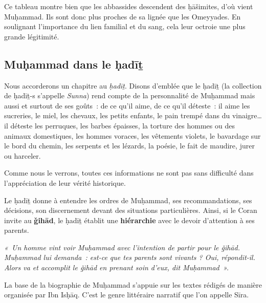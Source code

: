 Ce tableau montre bien que les abbassides descendent des ḥāšimites, d'où
vient Muḥammad. Ils sont donc plus proches de sa lignée que les
Omeyyades. En soulignant l'importance du lien familial et du sang, cela
leur octroie une plus grande légitimité.

 
\subsection{Muḥammad dans le ḥadīṯ
 }

Nous accorderons un chapitre au \emph{ḥadīṯ}. Disons d'emblée que le
ḥadīṯ (la collection de ḥadīṯ-s s'appelle \emph{Sunna}) rend compte de
la personnalité de Muḥammad mais aussi et surtout de ses goûts~: de ce
qu'il aime, de ce qu'il déteste~: il aime les sucreries, le miel, les
chevaux, les petits enfants, le pain trempé dans du vinaigre\ldots{} il
déteste les perruques, les barbes épaisses, la torture des hommes ou des
animaux domestiques, les hommes voraces, les vêtements violets, le
bavardage sur le bord du chemin, les serpents et les lézards, la poésie,
le fait de maudire, jurer ou harceler.

Comme nous le verrons, toutes ces informations ne sont pas sans
difficulté dans l'appréciation de leur vérité historique.

Le ḥadīṯ donne à entendre les ordres de Muḥammad, ses recommandations,
ses décisions, son discernement devant des situations particulières.
Ainsi, si le Coran invite au \textbf{ǧihād}, le ḥadīṯ établit une
\textbf{hiérarchie} avec le devoir d'attention à ses parents.

\emph{«~Un homme vint voir Muḥammad avec l'intention de partir pour le
ǧihād. Muḥammad lui demanda~: est-ce que tes parents sont vivants ? Oui,
répondit-il. Alors va et accomplit le ǧihād en prenant soin d'eux, dit
Muḥammad~».}

La base de la biographie de Muḥammad s'appuie sur les textes rédigés de
manière organisée par Ibn Isḥāq. C'est le genre littéraire narratif que
l'on appelle Sīra.


